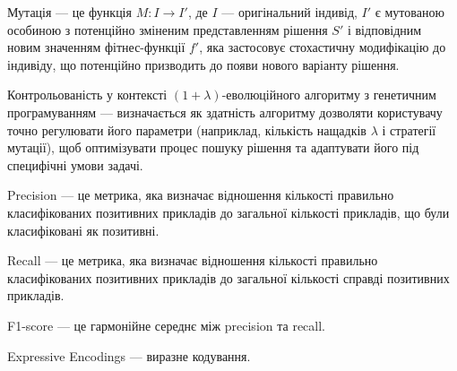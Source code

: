 Мутація --- це функція \( M: I \rightarrow I' \), де \( I \) — оригінальний індивід, \( I' \) є мутованою особиною з потенційно зміненим представленням рішення \( S' \) і відповідним новим значенням фітнес-функції \( f' \), яка застосовує стохастичну модифікацію до індивіду, що потенційно призводить до появи нового варіанту рішення.

Контрольованість у контексті $(1+\lambda)$-еволюційного алгоритму з генетичним програмуванням --- визначається як здатність алгоритму дозволяти користувачу точно регулювати його параметри (наприклад, кількість нащадків $\lambda$ і стратегії мутації), щоб оптимізувати процес пошуку рішення та адаптувати його під специфічні умови задачі.

Precision --- це метрика, яка визначає відношення кількості правильно класифікованих позитивних прикладів до загальної кількості прикладів, що були класифіковані як позитивні.

Recall --- це метрика, яка визначає відношення кількості правильно класифікованих позитивних прикладів до загальної кількості справді позитивних прикладів.

F1-score --- це гармонійне середнє між precision та recall.

Expressive Encodings --- виразне кодування.